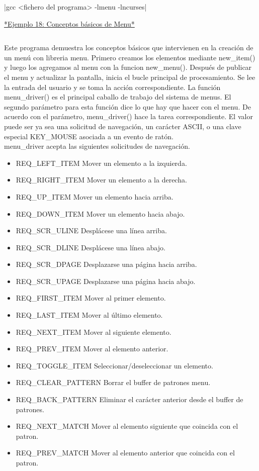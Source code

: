 \documentclass{article}
\begin{document}
|gcc <fichero del programa> -lmenu -lncurses|

\href{https://github.com/nasciiboy/NCURSES-Programming-HOWTO/blob/master/ncurses_programs/menus/menu_simple.c}{*Ejemplo 18: Conceptos básicos de Menu*}
\inputminted{cpp}{./cpp/018_conceptos_menu.cpp}

Este programa demuestra los conceptos básicos que intervienen en la creación de
un menú con libreria menu. Primero creamos los elementos mediante new\_item() y
luego los agregamos al menu con la funcion new\_menu(). Después de publicar el
menu y actualizar la pantalla, inicia el bucle principal de procesamiento. Se
lee la entrada del usuario y se toma la acción correspondiente. La función
menu\_driver() es el principal caballo de trabajo del sistema de menus. El
segundo parámetro para esta función dice lo que hay que hacer con el menu. De
acuerdo con el parámetro, menu\_driver() hace la tarea correspondiente. El valor
puede ser ya sea una solicitud de navegación, un carácter ASCII, o una clave
especial KEY\_MOUSE asociada a un evento de ratón.\\

menu\_driver acepta las siguientes solicitudes de navegación.

\begin{itemize}
  \item REQ\_LEFT\_ITEM        Mover un elemento a la izquierda.
  \item REQ\_RIGHT\_ITEM       Mover un elemento a la derecha.
  \item REQ\_UP\_ITEM          Mover un elemento hacia arriba.
  \item REQ\_DOWN\_ITEM        Mover un elemento hacia abajo.
  \item REQ\_SCR\_ULINE        Desplácese una línea arriba.
  \item REQ\_SCR\_DLINE        Desplácese una línea abajo.
  \item REQ\_SCR\_DPAGE        Desplazarse una página hacia arriba.
  \item REQ\_SCR\_UPAGE        Desplazarse una página hacia abajo.
  \item REQ\_FIRST\_ITEM       Mover al primer elemento.
  \item REQ\_LAST\_ITEM        Mover al último elemento.
  \item REQ\_NEXT\_ITEM        Mover al siguiente elemento.
  \item REQ\_PREV\_ITEM        Mover al elemento anterior.
  \item REQ\_TOGGLE\_ITEM      Seleccionar/deseleccionar un elemento.
  \item REQ\_CLEAR\_PATTERN    Borrar el buffer de patrones menu.
  \item REQ\_BACK\_PATTERN     Eliminar el carácter anterior desde el buffer de patrones.
  \item REQ\_NEXT\_MATCH       Mover al elemento siguiente que coincida con el patron.
  \item REQ\_PREV\_MATCH       Mover al elemento anterior que coincida con el patron.
\end{itemize}
\end{document}
